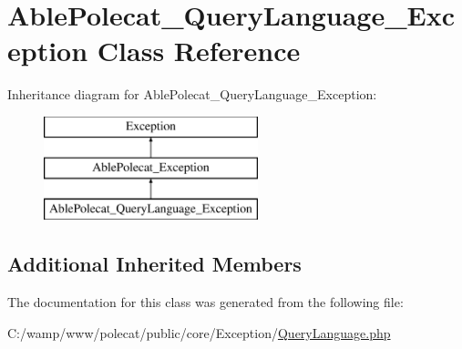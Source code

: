 \hypertarget{class_able_polecat___query_language___exception}{}\section{Able\+Polecat\+\_\+\+Query\+Language\+\_\+\+Exception Class Reference}
\label{class_able_polecat___query_language___exception}
Inheritance diagram for Able\+Polecat\+\_\+\+Query\+Language\+\_\+\+Exception\+:\begin{figure}[H]
\begin{center}
\leavevmode
\includegraphics[height=3.000000cm]{class_able_polecat___query_language___exception}
\end{center}
\end{figure}
\subsection*{Additional Inherited Members}


The documentation for this class was generated from the following file\+:\begin{DoxyCompactItemize}
\item 
C\+:/wamp/www/polecat/public/core/\+Exception/\hyperlink{_exception_2_query_language_8php}{Query\+Language.\+php}\end{DoxyCompactItemize}
